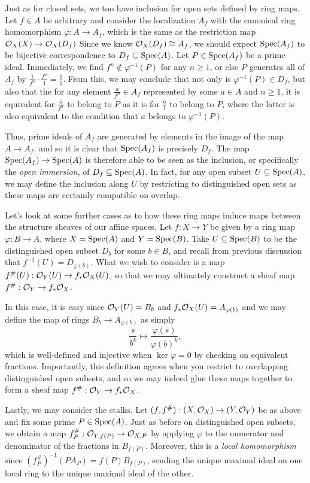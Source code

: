 Just as for closed sets, we too have inclusion for open sets defined by ring maps.
Let $f \in A$ be arbitrary and consider the localization $A_f$ with the canonical ring homomorphism $\varphi: A \to A_f$,
which is the same as the restriction map $\mathcal{O}_X(X) \to \mathcal{O}_X(D_f)$
Since we know $\mathcal{O}_X(D_f) \cong A_f$, 
we should expect ${\rm Spec}(A_f)$ to be bijective correspondence to $D_f \subseteq {\rm Spec}(A)$.
Let $P \in {\rm Spec}(A_f)$ be a prime ideal.
Immediately, we find $f^n \notin \varphi^{-1}(P)$ for any $n \geq 1$,
or else $P$ generates all of $A_f$ by $\frac{1}{f^n} \cdot \frac{f^n}{1} = \frac{1}{1}$.
From this, we may conclude that not only is $\varphi^{-1}(P) \in D_f$,
but also that the for any element $\frac{a}{f^n} \in A_f$ represented by some $a \in A$ and $n \geq 1$, 
it is equivalent for $\frac{a}{f^n}$ to belong to $P$ as it is for $\frac{a}{1}$ to belong to $P$,
where the latter is also equivalent to the condition that $a$ belongs to $\varphi^{-1}(P)$.

Thus, prime ideals of $A_f$ are generated by elements in the image of the map $A \to A_f$,
and so it is clear that ${\rm Spec}(A_f)$ is precisely $D_f$.
The map ${\rm Spec}(A_f) \to {\rm Spec}(A)$ is therefore able to be seen as the inclusion, 
or specifically the \textit{open immersion},
of $D_f \subseteq {\rm Spec}(A)$.
In fact, for any open subset $U \subseteq {\rm Spec}(A)$,
we may define the inclusion along $U$ by restricting to distinguished open sets as these maps are certainly compatible on overlap.

Let's look at some further cases as to how these ring maps induce maps between the structure sheaves of our affine spaces.
Let $f : X \to Y$ be given by a ring map $\varphi : B \to A$,
where $X = {\rm Spec}(A)$ and $Y = {\rm Spec}(B)$.
Take $U \subseteq {\rm Spec}(B)$ to be the distinguished open subset $D_b$ for some $b \in B$,
and recall from previous discussion that $f^{-1}(U) = D_{\varphi(b)}$.
What we wish to consider is a map $f^\#(U) : \mathcal{O}_Y(U) \to f_* \mathcal{O}_X(U)$,
so that we may ultimately construct a sheaf map $f^\# : \mathcal{O}_Y \to f_* \mathcal{O}_X$.

In this case, it is easy since $\mathcal{O}_Y(U) = B_b$ and $f_* \mathcal{O}_X(U) = A_{\varphi(b)}$ and we may define the map of rings $B_b \to A_{\varphi(b)}$ as simply
\[
    \frac{s}{b^k} \mapsto \frac{\varphi(s)}{\varphi(b)^k},
\]
which is well-defined and injective when $\ker \varphi = 0$ by checking on equivalent fractions.
Importantly, this definition agrees when you restrict to overlapping distinguished open subsets,
and so we may indeed glue these maps together to form a sheaf map $f^\# : \mathcal{O}_Y \to f_* \mathcal{O}_X$.

Lastly, we may consider the stalks.
Let $(f, f^\#) : (X, \mathcal{O}_X) \to (Y, \mathcal{O}_Y)$ be as above and fix some prime $P \in {\rm Spec}(A)$.
Just as before on distinguished open subsets, 
we obtain a map $f^\#_P : \mathcal{O}_{Y, f(P)} \to \mathcal{O}_{X, P}$ by applying $\varphi$ to the numerator and denominator of the fractions in $B_{f(P)}$.
Moreover, this is a \textit{local homomorphism} since $(f^\#_P)^{-1}(P A_P) = f(P) B_{f(P)}$,
sending the unique maximal ideal on one local ring to the unique maximal ideal of the other.
